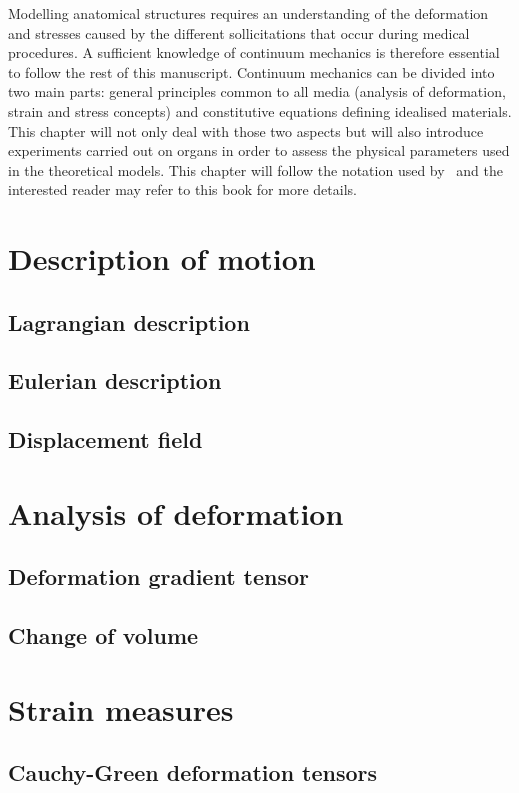 Modelling anatomical structures requires an understanding of the deformation and stresses caused by the different sollicitations that occur during medical procedures. A sufficient knowledge of continuum mechanics is therefore essential to follow the rest of this manuscript. Continuum mechanics can be divided into two main parts: general principles common to all media (analysis of deformation, strain and stress concepts) and constitutive equations defining idealised materials. This chapter will not only deal with those two aspects but will also introduce experiments carried out on organs in order to assess the physical parameters used in the theoretical models. This chapter will follow the notation used by~\cite{Reddy07} and the interested reader may refer to this book for more details.  


\section{Description of motion}
	\subsection{Lagrangian description}
	\subsection{Eulerian description}
	\subsection{Displacement field}
	
\section{Analysis of deformation}
	\subsection{Deformation gradient tensor}
	\subsection{Change of volume}
		
\section{Strain measures}
	\subsection{Cauchy-Green deformation tensors}
